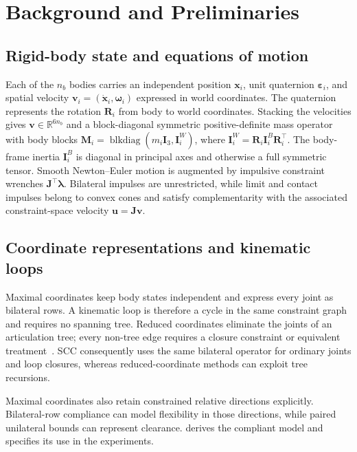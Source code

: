 \documentclass{article}
\newcommand{\M}{\mathbf{M}}
\newcommand{\Jac}{\mathbf{J}}
\newcommand{\vv}{\mathbf{v}}
\newcommand{\blam}{\boldsymbol{\lambda}}
\newcommand{\Rbb}{\mathbb{R}}
\newcommand{\uvel}{\mathbf{u}}           %
\newcommand{\Id}{\mathbf{I}}
\theoremstyle{plain}
\theoremstyle{definition}
\begin{document}
\section{Background and Preliminaries}
\label{sec:background}

\subsection{Rigid-body state and equations of motion}
\label{sec:eom}
Each of the $n_b$ bodies carries an independent position $\mathbf x_i$, unit
quaternion $\boldsymbol\varepsilon_i$, and spatial velocity
$\vv_i=(\dot{\mathbf x}_i,\boldsymbol\omega_i)$ expressed in world coordinates.
The quaternion represents the rotation $\mathbf R_i$ from body to world
coordinates. Stacking the velocities gives $\vv\in\Rbb^{6n_b}$ and a
block-diagonal symmetric positive-definite mass operator with body blocks
$\M_i=\operatorname{blkdiag}(m_i\Id_3,\mathbf I_i^W)$, where
$\mathbf I_i^W=\mathbf R_i\mathbf I_i^B\mathbf R_i^\top$. The body-frame inertia
$\mathbf I_i^B$ is diagonal in principal axes and otherwise a full symmetric
tensor. Smooth Newton--Euler motion is
augmented by impulsive constraint wrenches $\Jac^{\top}\blam$. Bilateral
impulses are unrestricted, while limit and contact impulses belong to convex
cones and satisfy complementarity with the associated constraint-space
velocity $\uvel=\Jac\vv$.

\subsection{Coordinate representations and kinematic loops}
\label{sec:coordinates-loops}
Maximal coordinates keep body states independent and express every joint as
bilateral rows. A kinematic loop is therefore a cycle in the same constraint
graph and requires no spanning tree. Reduced coordinates eliminate the joints
of an articulation tree; every non-tree edge requires a closure constraint or
equivalent treatment~\cite{featherstone2008,tsounis2025}. SCC consequently uses
the same bilateral operator for ordinary joints and loop closures, whereas
reduced-coordinate methods can exploit tree recursions.

Maximal coordinates also retain constrained relative directions explicitly.
Bilateral-row compliance can model flexibility in those directions, while
paired unilateral bounds can represent clearance. 
derives the compliant model and specifies its use in the experiments.
\end{document}
